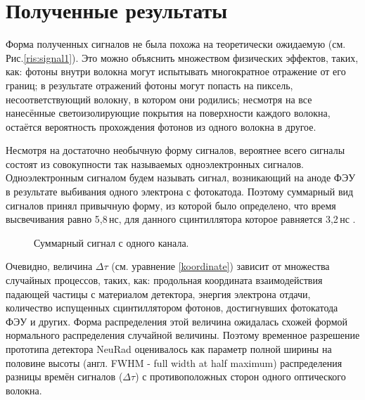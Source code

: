 \section{Полученные результаты}

\label{NeuRadres}

Форма полученных сигналов не была похожа на теоретически ожидаемую (см. Рис.\ref{ris:signal1}). Это можно объяснить множеством физических эффектов, таких, как: фотоны внутри волокна могут испытывать многократное отражение от его границ; в результате отражений фотоны могут попасть на пиксель, несоответствующий волокну, в котором они родились; несмотря на все нанесённые светоизолирующие покрытия на поверхности каждого волокна, остаётся вероятность прохождения фотонов из одного волокна в другое.

Несмотря на достаточно необычную форму сигналов, вероятнее всего сигналы состоят из совокупности так называемых одноэлектронных сигналов. Одноэлектронным сигналом будем называть сигнал, возникающий на аноде ФЭУ в результате выбивания одного электрона с фотокатода. Поэтому суммарный вид сигналов принял привычную форму, из которой было определено, что время высвечивания равно 5,8\,нс, для данного сцинтиллятора которое равняется 3,2\,нс \cite{crystals}.

\begin{figure}[h]
	\caption{Суммарный сигнал с одного канала.}
	\label{ris:integralform}
\end{figure}

Очевидно, величина $\Delta\tau$ (см. уравнение \eqref{koordinate}) зависит от множества случайных процессов, таких, как: продольная координата взаимодействия падающей частицы с материалом детектора, энергия электрона отдачи, количество испущенных сцинтиллятором фотонов, достигнувших фотокатода ФЭУ и других. Форма распределения этой величина ожидалась схожей формой нормального распределения случайной величины. Поэтому временное разрешение прототипа детектора NeuRad оценивалось как параметр полной ширины на половине высоты (англ. FWHM - full width at half maximum) распределения разницы времён сигналов ($\Delta\tau$) с противоположных сторон одного оптического волокна.

